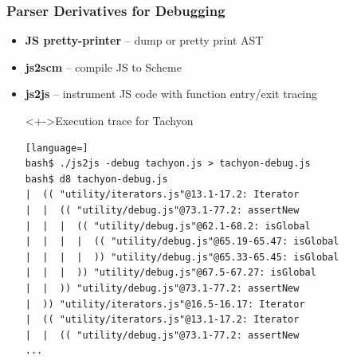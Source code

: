 \begin{frame}[fragile]
\frametitle{\bf Parser Derivatives for Debugging}

  \begin{itemize}

  \item {\bf JS pretty-printer} -- dump or pretty print AST
    \smallskip

  \item {\bf js2scm} -- compile JS to Scheme
    \smallskip

  \item {\bf js2js} -- instrument JS code with function entry/exit tracing
    \smallskip

\begin{block}<+->{Execution trace for Tachyon}
\begin{lstlisting}[language=]
bash$ ./js2js -debug tachyon.js > tachyon-debug.js
bash$ d8 tachyon-debug.js
|  (( "utility/iterators.js"@13.1-17.2: Iterator
|  |  (( "utility/debug.js"@73.1-77.2: assertNew
|  |  |  (( "utility/debug.js"@62.1-68.2: isGlobal
|  |  |  |  (( "utility/debug.js"@65.19-65.47: isGlobal
|  |  |  |  )) "utility/debug.js"@65.33-65.45: isGlobal
|  |  |  )) "utility/debug.js"@67.5-67.27: isGlobal
|  |  )) "utility/debug.js"@73.1-77.2: assertNew
|  )) "utility/iterators.js"@16.5-16.17: Iterator
|  (( "utility/iterators.js"@13.1-17.2: Iterator
|  |  (( "utility/debug.js"@73.1-77.2: assertNew
...
\end{lstlisting}
\end{block}

  \end{itemize}

\end{frame}
